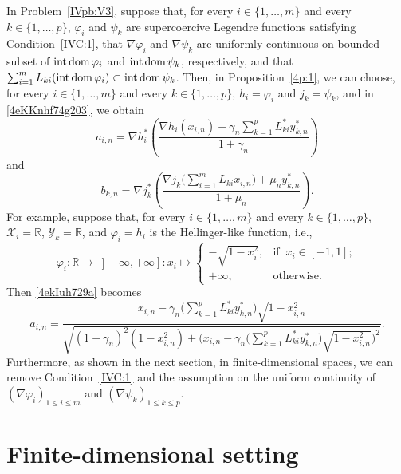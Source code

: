 \documentclass[a4paper,11pt,fleqn]{article}
\renewcommand{\leq}{\ensuremath{\leqslant}}
\newcommand{\RX}{\ensuremath{\left]-\infty,+\infty\right]}}
\newcommand{\XX}{\ensuremath{{\mathcal X}}}
\newcommand{\YY}{\ensuremath{{\mathcal Y}}}
\newcommand{\Sum}{\ensuremath{\displaystyle\sum}}
\newcommand{\RR}{\ensuremath{\mathbb{R}}}
\newcommand{\pinf}{\ensuremath{{+\infty}}}
\newcommand{\dom}{\ensuremath{\text{\rm dom}\,}}
\newcommand{\inte}{\ensuremath{\text{\rm int}\,}}
\theoremstyle{plain}{\theorembodyfont{\rmfamily}%
\newtheorem{conjecture}[theorem]{Conjecture}}
\theoremstyle{plain}{\theorembodyfont{\rmfamily}%
\newtheorem{example}[theorem]{Example}}
\theoremstyle{plain}{\theorembodyfont{\rmfamily}%
\newtheorem{remark}[theorem]{Remark}}
\theoremstyle{plain}{\theorembodyfont{\rmfamily}%
\newtheorem{algorithm}[theorem]{Algorithm}}
\theoremstyle{plain}{\theorembodyfont{\rmfamily}%
\newtheorem{condition}[theorem]{Condition}}
\theoremstyle{plain}{\theorembodyfont{\rmfamily}%
\newtheorem{definition}[theorem]{Definition}}
\theoremstyle{plain}{\theorembodyfont{\rmfamily}
\newtheorem{problem}[theorem]{Problem}}
\theoremstyle{plain}{\theorembodyfont{\rmfamily}
\newtheorem{notation}[theorem]{Notation}}
\numberwithin{equation}{section}
\begin{document}
\begin{remark}
In Problem~\ref{IVpb:V3}, suppose that, for every 
$i\in\{1,\ldots,m\}$ and every $k\in\{1,\ldots,p\}$, 
$\varphi_i$ and $\psi_k$ are supercoercive 
Legendre functions satisfying Condition~\ref{IVC:1}, 
that $\nabla\varphi_i$ and $\nabla\psi_k$ are uniformly 
continuous on bounded subset of $\inte\dom\varphi_i$ 
and $\inte\dom\psi_k$, respectively, and that
$\sum_{i=1}^mL_{ki}(\inte\dom\varphi_i)\subset\inte\dom\psi_k$. 
Then, in Proposition~\ref{4p:1}, we can choose, for every 
$i\in\{1,\ldots,m\}$ and every $k\in\{1,\ldots,p\}$, 
$h_i=\varphi_i$ and $j_k=\psi_k$, and in \eqref{4eKKnhf74g203}, 
we obtain
\begin{equation}
\label{4ekIuh729a}
a_{i,n}=\nabla h_i^*\left(\frac{\nabla h_i(x_{i,n})
-\gamma_n\Sum_{k=1}^pL_{ki}^*y_{k,n}^*}{1+\gamma_n}\right)
\end{equation}
and
\begin{equation}
b_{k,n}=\nabla j_k^*\left(\frac{\nabla j_k\bigg(\Sum_{i=1}^m
L_{ki}x_{i,n}\bigg)+\mu_ny_{k,n}^*}{1+\mu_n}\right).
\end{equation}
For example, suppose that, for every $i\in\{1,\ldots,m\}$ 
and every $k\in\{1,\ldots,p\}$, $\XX_i=\RR$, 
$\YY_k=\RR$, and $\varphi_i=h_i$ is the Hellinger-like 
function, i.e.,
\begin{equation}
\varphi_i\colon\RR\to\RX\colon x_i\mapsto
\begin{cases}
-\sqrt{1-x_i^2},&\text{if}\;\;
x_i\in\left[-1,1\right];\\
\pinf,&\text{otherwise}.
\end{cases}
\end{equation}
Then \eqref{4ekIuh729a} becomes
\begin{equation}
\label{4ekIuh729b}
a_{i,n}=\frac{x_{i,n}-\gamma_n
\bigg(\Sum_{k=1}^pL_{ki}^*y_{k,n}^*\bigg)\sqrt{1-x_{i,n}^2}}
{\sqrt{(1+\gamma_n)^2(1-x_{i,n}^2)+\bigg(x_{i,n}
-\gamma_n\bigg(\Sum_{k=1}^pL_{ki}^*y_{k,n}^*\bigg)
\sqrt{1-x_{i,n}^2}\bigg)^2}}.
\end{equation}
Furthermore, as shown in the next section, in 
finite-dimensional spaces, we can remove Condition~\ref{IVC:1} 
and the assumption on the uniform continuity of 
$(\nabla\varphi_i)_{1\leq i\leq m}$ and 
$(\nabla\psi_k)_{1\leq k\leq p}$.
\end{remark}

\section{Finite-dimensional setting}
\label{sec:4}
\end{document}
